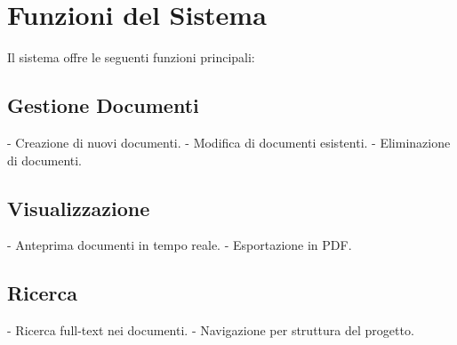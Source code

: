 \section{Funzioni del Sistema}

Il sistema offre le seguenti funzioni principali:

\subsection{Gestione Documenti}

- Creazione di nuovi documenti.
- Modifica di documenti esistenti.
- Eliminazione di documenti.

\subsection{Visualizzazione}

- Anteprima documenti in tempo reale.
- Esportazione in PDF.

\subsection{Ricerca}

- Ricerca full-text nei documenti.
- Navigazione per struttura del progetto.
